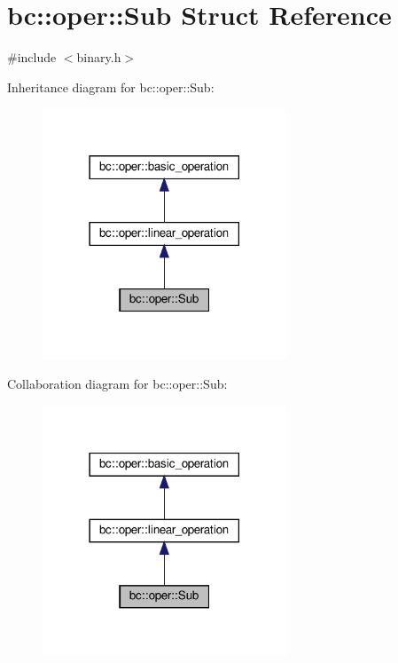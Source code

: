 \hypertarget{structbc_1_1oper_1_1Sub}{}\section{bc\+:\+:oper\+:\+:Sub Struct Reference}
\label{structbc_1_1oper_1_1Sub}


{\ttfamily \#include $<$binary.\+h$>$}



Inheritance diagram for bc\+:\+:oper\+:\+:Sub\+:\nopagebreak
\begin{figure}[H]
\begin{center}
\leavevmode
\includegraphics[width=206pt]{structbc_1_1oper_1_1Sub__inherit__graph}
\end{center}
\end{figure}


Collaboration diagram for bc\+:\+:oper\+:\+:Sub\+:\nopagebreak
\begin{figure}[H]
\begin{center}
\leavevmode
\includegraphics[width=206pt]{structbc_1_1oper_1_1Sub__coll__graph}
\end{center}
\end{figure}
